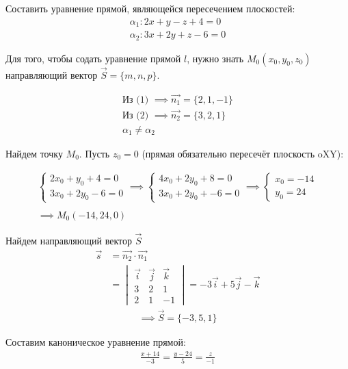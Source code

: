 \begin{eg}
  Составить уравнение прямой, являющейся пересечением плоскостей:
  \begin{gather*}
    \alpha_1: 2x + y - z + 4 = 0 \\
    \alpha_2: 3x + 2y + z - 6 = 0
  \end{gather*}

Для того, чтобы содать уравнение прямой $l$, нужно знать  $M_0(x_0, y_0, z_0)$ направляющий вектор $\vec{S} = \{m, n, p\}$.

\begin{gather*}
  \text{Из (1) } \implies \vec{n_1} = \{2, 1, -1\} \\ 
  \text{Из (2) } \implies \vec{n_2} = \{3, 2, 1\} \\
  \alpha_1 \neq \alpha_2
\end{gather*}

Найдем точку $M_0$.
Пусть $z_0 = 0$ (прямая обязательно пересечёт плоскость oXY):

\begin{gather*}
  \begin{cases}
    2x_0 + y_0 + 4 = 0 \\
    3x_0 + 2y_0 - 6 = 0
  \end{cases} \implies 
  \begin{cases}
    4x_0 + 2y_0 + 8 = 0 \\
    3x_0 + 2y_0 + - 6 = 0
  \end{cases} \implies
  \begin{cases}
    x_0 = -14 \\
    y_0 = 24
  \end{cases} \\
  \\
  \implies M_0(-14, 24, 0)
\end{gather*}

Найдем направляющий вектор $\vec{S}$
\begin{align*}
  \vec{s} &= \vec{n_2} \cdot \vec{n_1} \\
          &= 
  \begin{vmatrix}
    \vec{i} & \vec{j} & \vec{k} \\
    3 & 2 & 1 \\
    2 & 1 & -1
  \end{vmatrix} = -3 \vec{i} + 5 \vec{j} - \vec{k}
\end{align*}
\begin{gather*}
  \implies \vec{S} = \{-3, 5, 1\} 
\end{gather*}

Составим каноническое уравнение прямой:
\begin{gather*}
  \frac{x + 14}{-3} = \frac{y - 24}{5} = \frac{z}{-1}
\end{gather*}
\end{eg}

